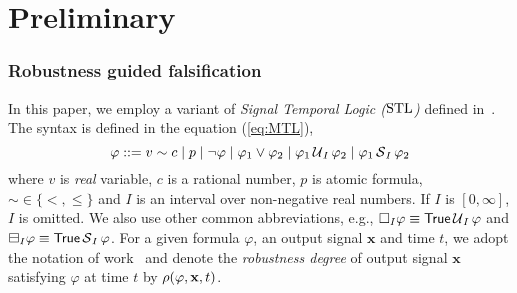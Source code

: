 \section{Preliminary}\label{sec:preliminary}

\subsubsection{{Robustness guided falsification}}
%
In this paper, we employ a variant of \emph{Signal Temporal Logic ($\mathrm{STL}$)} defined in~\cite{bartocci2018specification}. The syntax is defined in the equation (\ref{eq:MTL}),
\begin{equation}\label{eq:MTL}
  \varphi ::= v \sim c \mid p \mid \neg \varphi \mid
  \varphi_1 \vee \varphi_2
  \mid \varphi_1 \operatorname{\mathcal{U}}_I \varphi_2
  \mid \varphi_1 \operatorname{\mathcal{S}}_I \varphi_2
\end{equation}
where $v$ is \emph{real} variable,
$c$ is a rational number,
$p$ is atomic formula,
$\sim \in \{<, \leq\}$
and $I$ is an interval over non-negative real numbers.
If $I$ is $[0, \infty]$, $I$ is omitted.
We also use other common abbreviations,
e.g., $\square_I \varphi \equiv \mathsf{True} \operatorname{\mathcal{U}}_I \varphi$ and
$\boxminus_I \varphi \equiv \mathsf{True} \operatorname{\mathcal{S}}_I \varphi$.
For a given formula $\varphi$, an output signal $\mathbf{x}$ and time $t$, we adopt the notation of work~\cite{bartocci2018specification} and denote the \emph{robustness degree} of output signal $\mathbf{x}$ satisfying $\varphi$ at time $t$ by $\operatorname{\rho}(\varphi, \mathbf{x}, t)$.


